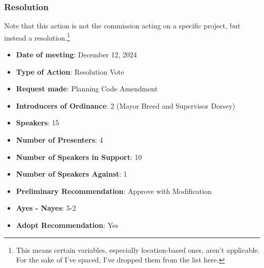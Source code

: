 \documentclass{article}[11pt]
\begin{document}
		\subsubsection{Resolution}
	\label{sec:operationalization_1}
	Note that this action is not the commission acting on a specific project, but instead a resolution.\footnote{This means certain variables, especially location-based ones, aren't applicable. For the sake of I've spaced, I've dropped them from the list here.}
	\begin{itemize}
	\itemsep0em 
		\item \textbf{Date of meeting}: December 12, 2024
		\item \textbf{Type of Action}: Resolution Vote
		\item \textbf{Request made}: Planning Code Amendment
		\item \textbf{Introducers of Ordinance}: 2 (Mayor Breed and Supervisor Dorsey)
		\item \textbf{Speakers}: 15
		\item \textbf{Number of Presenters}: 4
		\item \textbf{Number of Speakers in Support}: 10
		\item \textbf{Number of Speakers Against}: 1
		\item \textbf{Preliminary Recommendation}:  Approve with Modification
		\item \textbf{Ayes - Nayes}: 5-2
		\item \textbf{Adopt Recommendation}: Yes
	\end{itemize}
	
\end{document}

